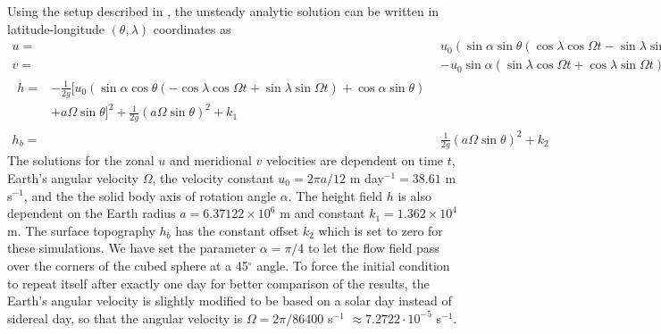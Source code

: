 Using the setup described in \cite{Lauter:2005uq}, the unsteady analytic solution
can be written in latitude-longitude $(\theta, \lambda)$ coordinates as
\begin{align}
    \label{eq:usbru} u  = & u_0 \left(\sin\alpha \sin\theta \left(\cos\lambda \cos\Omega t -
         \sin\lambda \sin\Omega t\right) + \cos\alpha \cos\theta\right) \\
    \label{eq:usbrv} v  = & -u_0 \sin\alpha \left(\sin\lambda \cos\Omega t +
       \cos\lambda \sin\Omega t\right) \\
    \begin{split} \label{eq:usbrh} h = & -\frac{1}{2g}[u_0\left(\sin\alpha \cos\theta 
        \left(-\cos\lambda \cos\Omega t + \sin\lambda \sin\Omega t\right)  +
        \cos\alpha \sin\theta\right)  \\ 
        &+ a\Omega\sin\theta]^2 + \frac{1}{2g} \left(a\Omega\sin\theta\right)^2 + k_1 
     \end{split} \\
    \label{eq:usbrb} h_b = & \frac{1}{2g}\left(a\Omega\sin\theta\right)^2 + k_2
\end{align}
The solutions for the zonal $u$ and meridional $v$ velocities are dependent on time 
$t$, Earth's angular velocity $\Omega$, the velocity constant $u_0 = 2\pi a / 12$ m day$^{-1} = 38.61$ m s$^{-1}$, 
and the the solid body axis of rotation angle $\alpha$. The height field $h$ is also
dependent on the Earth radius $a =6.37122 \times 10^{6}$ m 
and constant $k_1 = 1.362 \times 10^4$ m. The surface 
topography $h_b$ has the constant offset $k_2$ which is set to zero for these simulations.
We have set the parameter $\alpha = \pi/4$ to
let the flow field pass over the corners of the cubed sphere at a 45$^\circ$ angle.  To force
the initial condition to repeat itself after exactly one day for better
comparison of the results, the Earth's angular velocity is slightly
modified to be based on a solar day instead of sidereal day, so that the
angular velocity is $\Omega = 2 \pi/86400$ s$^{-1}$ $\approx 7.2722\cdot 10^{-5}$ s$^{-1}$.

